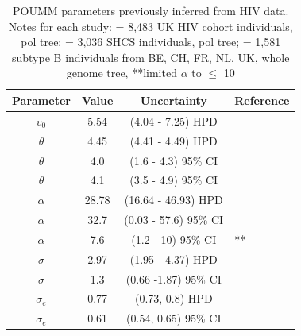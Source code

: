 \documentclass[]{article}
\begin{document}
\begin{doublespace}
\begin{table}[H]
	\begin{center}
		\begin{tabular}{cccl}
			\toprule 
			Parameter & Value & Uncertainty & Reference \\
			\midrule 
			$v_0$ & 5.54 & (4.04 - 7.25) HPD & \citealt{Mitov2018} \\
			$\theta$ & 4.45 & (4.41 - 4.49) HPD& \citealt{Mitov2018}  \\
			$\theta$ &  4.0 & (1.6 - 4.3) 95\% CI & \citealt{Bertels2018} \\
			$\theta$ & 4.1 & (3.5 - 4.9) 95\% CI & \citealt{Blanquart2017} \\
			$\alpha$ & 28.78 & (16.64 - 46.93) HPD & \citealt{Mitov2018} \\
			$\alpha$ & 32.7 & (0.03 - 57.6) 95\% CI & \citealt{Bertels2018} \\
			$\alpha$ & 7.6 & (1.2 - 10) 95\% CI & \citealt{Blanquart2017}** \\
			$\sigma$ & 2.97 & (1.95 - 4.37) HPD & \citealt{Mitov2018} \\
			$\sigma$ & 1.3 & (0.66 -1.87) 95\% CI &  \citealt{Blanquart2017} \\
			$\sigma_e$ & 0.77 & (0.73, 0.8) HPD & \citealt{Mitov2018} \\
			$\sigma_e$ & 0.61 & (0.54, 0.65) 95\% CI &  \citealt{Blanquart2017} \\
			\bottomrule 
		\end{tabular}
		\caption{POUMM parameters previously inferred from HIV data. Notes for each study: \protect\citet{Mitov2018} = 8,483 UK HIV cohort individuals, pol tree; \protect\citet{Bertels2018} = 3,036 SHCS individuals, pol tree; \protect\citet{Blanquart2017} = 1,581 subtype B individuals from BE, CH, FR, NL, UK, whole genome tree, **limited $\alpha$ to $\le$ 10}
		\label{tab:POUMMparams}
	\end{center}
\end{table}


\end{doublespace}
\end{document}
